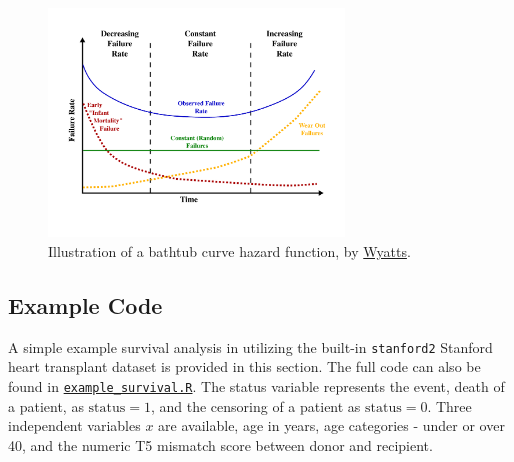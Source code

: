 \begin{figure}[H]
\centering
\includegraphics[width=0.7\textwidth]{figures/survival/bathtub_curve}
\vspace{0.2cm}
\caption{
Illustration of a bathtub curve hazard function, by \href{https://en.wikipedia.org/wiki/File:Bathtub_curve.svg}{Wyatts}.
}
\label{fig:bathtub_curve}
\end{figure}

\subsection{Example \R Code}
\label{additional:Survival:Rcode}


A simple example survival analysis in \R utilizing the built-in
\texttt{stanford2} Stanford heart transplant dataset is provided in this section.
The full code can also be found in
\href{https://github.com/mepland/data_science_notes/blob/main/sections/appendixes/additional/example_survival.R}{\texttt{example\_survival.R}}.
The status variable represents the event, death of a patient, as $\text{status}=1$,
and the censoring of a patient as $\text{status}=0$.
Three independent variables $x$ are available,
age in years,
age categories - under or over 40,
and the numeric T5 mismatch score between donor and recipient.

